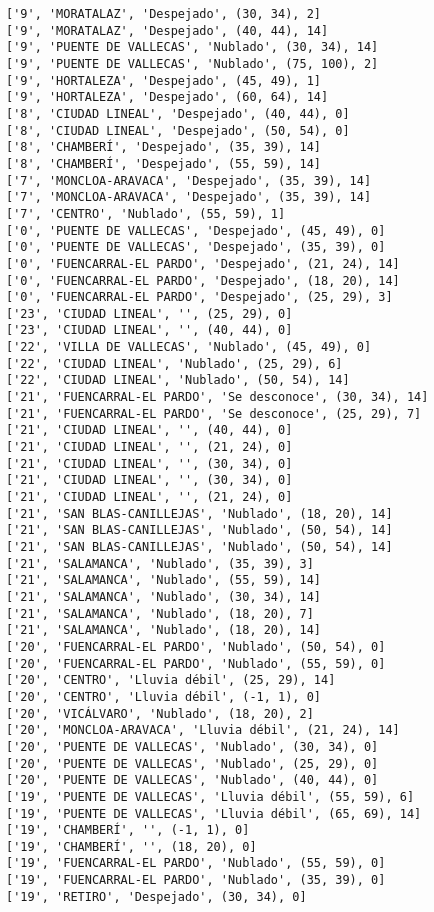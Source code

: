 \documentclass[11pt]{article}
\begin{document}
\begin{Verbatim}[commandchars=\\\{\}]
['9', 'MORATALAZ', 'Despejado', (30, 34), 2]
['9', 'MORATALAZ', 'Despejado', (40, 44), 14]
['9', 'PUENTE DE VALLECAS', 'Nublado', (30, 34), 14]
['9', 'PUENTE DE VALLECAS', 'Nublado', (75, 100), 2]
['9', 'HORTALEZA', 'Despejado', (45, 49), 1]
['9', 'HORTALEZA', 'Despejado', (60, 64), 14]
['8', 'CIUDAD LINEAL', 'Despejado', (40, 44), 0]
['8', 'CIUDAD LINEAL', 'Despejado', (50, 54), 0]
['8', 'CHAMBERÍ', 'Despejado', (35, 39), 14]
['8', 'CHAMBERÍ', 'Despejado', (55, 59), 14]
['7', 'MONCLOA-ARAVACA', 'Despejado', (35, 39), 14]
['7', 'MONCLOA-ARAVACA', 'Despejado', (35, 39), 14]
['7', 'CENTRO', 'Nublado', (55, 59), 1]
['0', 'PUENTE DE VALLECAS', 'Despejado', (45, 49), 0]
['0', 'PUENTE DE VALLECAS', 'Despejado', (35, 39), 0]
['0', 'FUENCARRAL-EL PARDO', 'Despejado', (21, 24), 14]
['0', 'FUENCARRAL-EL PARDO', 'Despejado', (18, 20), 14]
['0', 'FUENCARRAL-EL PARDO', 'Despejado', (25, 29), 3]
['23', 'CIUDAD LINEAL', '', (25, 29), 0]
['23', 'CIUDAD LINEAL', '', (40, 44), 0]
['22', 'VILLA DE VALLECAS', 'Nublado', (45, 49), 0]
['22', 'CIUDAD LINEAL', 'Nublado', (25, 29), 6]
['22', 'CIUDAD LINEAL', 'Nublado', (50, 54), 14]
['21', 'FUENCARRAL-EL PARDO', 'Se desconoce', (30, 34), 14]
['21', 'FUENCARRAL-EL PARDO', 'Se desconoce', (25, 29), 7]
['21', 'CIUDAD LINEAL', '', (40, 44), 0]
['21', 'CIUDAD LINEAL', '', (21, 24), 0]
['21', 'CIUDAD LINEAL', '', (30, 34), 0]
['21', 'CIUDAD LINEAL', '', (30, 34), 0]
['21', 'CIUDAD LINEAL', '', (21, 24), 0]
['21', 'SAN BLAS-CANILLEJAS', 'Nublado', (18, 20), 14]
['21', 'SAN BLAS-CANILLEJAS', 'Nublado', (50, 54), 14]
['21', 'SAN BLAS-CANILLEJAS', 'Nublado', (50, 54), 14]
['21', 'SALAMANCA', 'Nublado', (35, 39), 3]
['21', 'SALAMANCA', 'Nublado', (55, 59), 14]
['21', 'SALAMANCA', 'Nublado', (30, 34), 14]
['21', 'SALAMANCA', 'Nublado', (18, 20), 7]
['21', 'SALAMANCA', 'Nublado', (18, 20), 14]
['20', 'FUENCARRAL-EL PARDO', 'Nublado', (50, 54), 0]
['20', 'FUENCARRAL-EL PARDO', 'Nublado', (55, 59), 0]
['20', 'CENTRO', 'Lluvia débil', (25, 29), 14]
['20', 'CENTRO', 'Lluvia débil', (-1, 1), 0]
['20', 'VICÁLVARO', 'Nublado', (18, 20), 2]
['20', 'MONCLOA-ARAVACA', 'Lluvia débil', (21, 24), 14]
['20', 'PUENTE DE VALLECAS', 'Nublado', (30, 34), 0]
['20', 'PUENTE DE VALLECAS', 'Nublado', (25, 29), 0]
['20', 'PUENTE DE VALLECAS', 'Nublado', (40, 44), 0]
['19', 'PUENTE DE VALLECAS', 'Lluvia débil', (55, 59), 6]
['19', 'PUENTE DE VALLECAS', 'Lluvia débil', (65, 69), 14]
['19', 'CHAMBERÍ', '', (-1, 1), 0]
['19', 'CHAMBERÍ', '', (18, 20), 0]
['19', 'FUENCARRAL-EL PARDO', 'Nublado', (55, 59), 0]
['19', 'FUENCARRAL-EL PARDO', 'Nublado', (35, 39), 0]
['19', 'RETIRO', 'Despejado', (30, 34), 0]

\end{Verbatim}
\end{document}
